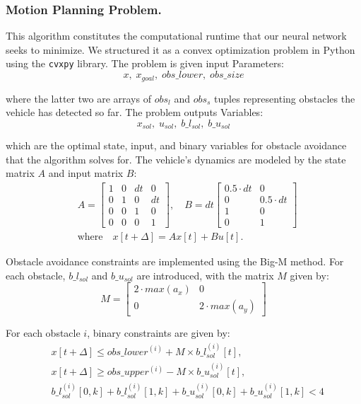 \documentclass[
	letterpaper, %
	10pt, %
	unnumberedsections, %
	twoside, %
]{LTJournalArticle}
\begin{document}
\subsubsection{Motion Planning Problem.} This algorithm constitutes the computational runtime that our neural network seeks to minimize. We structured it as a convex optimization problem in Python using the \texttt{cvxpy} library. The problem is given input Parameters:
\[x,\; x_{goal},\; obs\_lower,\; obs\_size\]

\noindent where the latter two are arrays of \(obs_l\) and \(obs_s\) tuples representing obstacles the vehicle has detected so far. The problem outputs Variables:
\[x_{sol},\; u_{sol},\; b\_l_{sol},\; b\_u_{sol}\]

\noindent which are the optimal state, input, and binary variables for obstacle avoidance that the algorithm solves for. The vehicle's dynamics are modeled by the state matrix \( A \) and input matrix \( B \):
\begin{align*}
    & A = \begin{bmatrix}
        1 & 0 & dt & 0 \\
        0 & 1 & 0 & dt \\
        0 & 0 & 1 & 0  \\
        0 & 0 & 0 & 1
    \end{bmatrix}, \quad
    B = dt \begin{bmatrix}
        0.5 \cdot dt & 0 \\
        0 & 0.5 \cdot dt \\
        1 & 0 \\
        0 & 1
    \end{bmatrix} \\
    & \text{where} \quad x[t+\Delta] = Ax[t] + Bu[t].
\end{align*}

Obstacle avoidance constraints are implemented using the Big-M method. For each obstacle, \(b\_l_{sol}\) and \(b\_u_{sol}\) are introduced, with the matrix \(M\) given by:
\[M = \begin{bmatrix}
2 \cdot max(a_x) & 0 \\
0 & 2 \cdot max(a_y)
\end{bmatrix}\]

\noindent For each obstacle \(i\), binary constraints are given by:
\begin{align*}
    & x[t+\Delta] \leq obs\_lower^{(i)} + M \times b\_l_{sol}^{(i)}[t], \\
    & x[t+\Delta] \geq obs\_upper^{(i)} - M \times b\_u_{sol}^{(i)}[t], \\
    & b\_l_{sol}^{(i)}[0, k] + b\_l_{sol}^{(i)}[1, k] + b\_u_{sol}^{(i)}[0, k] + b\_u_{sol}^{(i)}[1, k] < 4
\end{align*}
\end{document}
